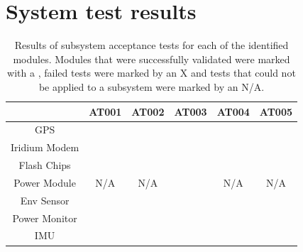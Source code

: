 \section{System test results}
\begin{table}[H]
	\centering
	\caption{Results of subsystem acceptance tests for each of the identified modules. Modules that were successfully validated were marked with a \checkmark, failed tests were marked by an X and tests that could not be applied to a subsystem were marked by an N/A.}
	\begin{tabular}{|c|c|c|c|c|c|}
		\cline{2-6}
		\multicolumn{1}{c|}{}&\textbf{AT001}&\textbf{AT002}&\textbf{AT003}&\textbf{AT004 }&\textbf{AT005 }\\
		\hline
		GPS &  \checkmark & \checkmark & \checkmark & \checkmark & \checkmark\\
		\hline
		Iridium Modem &  \checkmark & \checkmark & \checkmark & \checkmark & \checkmark\\
		\hline
		Flash Chips &  \checkmark & \checkmark & \checkmark & \checkmark &
		\checkmark\\ 
		\hline
		Power Module & N/A & N/A & \checkmark & N/A& N/A\\
		\hline
		Env Sensor  &  \checkmark & \checkmark & \checkmark & \checkmark &
		\checkmark\\
		\hline
		Power Monitor   &  \checkmark & \checkmark & \checkmark & \checkmark &
		\checkmark\\
		\hline
		IMU   &  \checkmark & \checkmark & \checkmark & \checkmark &
		\checkmark\\
		\hline
	\end{tabular}
	
	\label{tab:AT_SSYS_EV}
\end{table}
